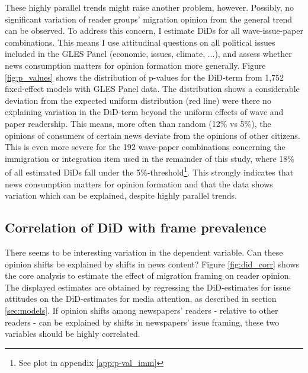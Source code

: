 \documentclass{article}
\begin{document}
These highly parallel trends might raise another problem, however. Possibly, no significant variation of reader groups' migration opinion from the general trend can be observed. To address this concern, I estimate DiDs for all wave-issue-paper combinations. This means I use attitudinal questions on all political issues included in the GLES Panel (economic, issues, climate, ...), and assess whether news consumption matters for opinion formation more generally. Figure \ref{fig:p_values} shows the distribution of p-values for the DiD-term from 1,752 fixed-effect models with GLES Panel data. The distribution shows a considerable deviation from the expected uniform distribution (red line) were there no explaining variation in the DiD-term beyond the uniform effects of wave and paper readership. This means, more often than random (12\% vs 5\%), the opinions of consumers of certain news deviate from the opinions of other citizens. This is even more severe for the 192 wave-paper combinations concerning the immigration or integration item used in the remainder of this study, where 18\% of all estimated DiDs fall under the 5\%-threshold\footnote{See plot in appendix \ref{app:p-val_imm}}.  This strongly indicates that news consumption matters for opinion formation and that the data shows variation which can be explained, despite highly parallel trends.



\subsection{Correlation of DiD with frame prevalence}

There seems to be interesting variation in the dependent variable. Can these opinion shifts be explained by shifts in news content? Figure \ref{fig:did_corr} shows the core analysis to estimate the effect of migration framing on reader opinion. The displayed estimates are obtained by regressing the DiD-estimates for issue attitudes on the DiD-estimates for media attention, as described in section \ref{sec:models}. If opinion shifts among newspapers' readers - relative to other readers - can be explained by shifts in newspapers' issue framing, these two variables should be highly correlated.
\end{document}

